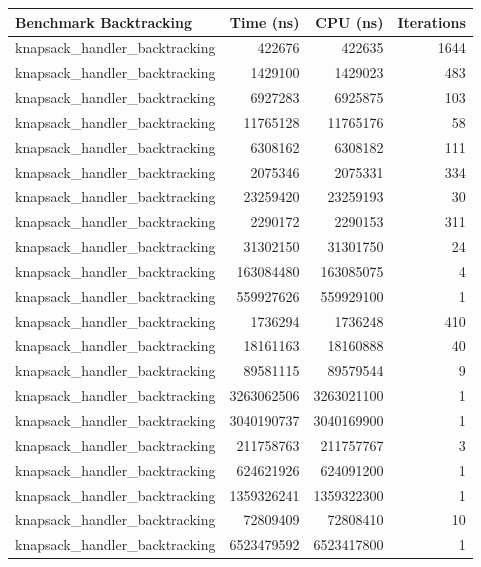 \documentclass{llncs}
\begin{document}
\begin{table}[ht]
    \centering
    \begin{tabular}{@{}lrrr@{}}
        \toprule
        \textbf{Benchmark Backtracking} & \textbf{Time (ns)} & \textbf{CPU (ns)} & \textbf{Iterations} \\
        \midrule
        knapsack\_handler\_backtracking & 422676 & 422635 & 1644 \\
        knapsack\_handler\_backtracking & 1429100 & 1429023 & 483 \\
        knapsack\_handler\_backtracking & 6927283 & 6925875 & 103 \\
        knapsack\_handler\_backtracking & 11765128 & 11765176 & 58 \\
        knapsack\_handler\_backtracking & 6308162 & 6308182 & 111 \\
        knapsack\_handler\_backtracking & 2075346 & 2075331 & 334 \\
        knapsack\_handler\_backtracking & 23259420 & 23259193 & 30 \\
        knapsack\_handler\_backtracking & 2290172 & 2290153 & 311 \\
        knapsack\_handler\_backtracking & 31302150 & 31301750 & 24 \\
        knapsack\_handler\_backtracking & 163084480 & 163085075 & 4 \\
        knapsack\_handler\_backtracking & 559927626 & 559929100 & 1 \\
        knapsack\_handler\_backtracking & 1736294 & 1736248 & 410 \\
        knapsack\_handler\_backtracking & 18161163 & 18160888 & 40 \\
        knapsack\_handler\_backtracking & 89581115 & 89579544 & 9 \\
        knapsack\_handler\_backtracking & 3263062506 & 3263021100 & 1 \\
        knapsack\_handler\_backtracking & 3040190737 & 3040169900 & 1 \\
        knapsack\_handler\_backtracking & 211758763 & 211757767 & 3 \\
        knapsack\_handler\_backtracking & 624621926 & 624091200 & 1 \\
        knapsack\_handler\_backtracking & 1359326241 & 1359322300 & 1 \\
        knapsack\_handler\_backtracking & 72809409 & 72808410 & 10 \\
        knapsack\_handler\_backtracking & 6523479592 & 6523417800 & 1 \\

\end{tabular}
\end{table}
\end{document}

